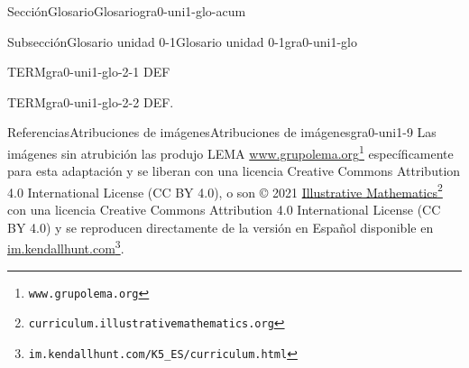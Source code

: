 \documentclass[twoside,10pt,]{article}
\begin{document}
\begin{sectionptx}{Sección}{Glosario}{}{Glosario}{}{}{gra0-uni1-glo-acum}
%
%
\typeout{************************************************}
\typeout{************************************************}
%
\begin{subsectionptx}{Subsección}{Glosario unidad 0-1}{}{Glosario unidad 0-1}{}{}{gra0-uni1-glo}
%
\begin{descriptionlist}
\begin{dlimedium}{TERM}{gra0-uni1-glo-2-1}%
DEF%
\end{dlimedium}%
\begin{dlimedium}{TERM}{gra0-uni1-glo-2-2}%
DEF.%
\end{dlimedium}%
\end{descriptionlist}
\end{subsectionptx}
\end{sectionptx}
%
%
\typeout{************************************************}
\typeout{************************************************}
%
\begin{references-section}{Referencias}{Atribuciones de imágenes}{}{Atribuciones de imágenes}{}{}{gra0-uni1-9}
Las imágenes sin atrubición las produjo LEMA \href{https://www.grupolema.org}{www.grupolema.org}\footnote{\nolinkurl{www.grupolema.org}\label{gra0-uni1-9-2-2}} específicamente para esta adaptación y se liberan con una licencia Creative Commons Attribution 4.0 International License (CC BY 4.0), o son © 2021 \href{https://curriculum.illustrativemathematics.org}{Illustrative Mathematics}\footnote{\nolinkurl{curriculum.illustrativemathematics.org}\label{gra0-uni1-9-2-4}} con una licencia Creative Commons Attribution 4.0 International License (CC BY 4.0) y se reproducen directamente de la versión en Español disponible en \href{https://im.kendallhunt.com/K5_ES/curriculum.html}{im.kendallhunt.com}\footnote{\nolinkurl{im.kendallhunt.com/K5_ES/curriculum.html}\label{gra0-uni1-9-2-6}}.%
\end{references-section}
%
%
\typeout{************************************************}
\typeout{************************************************}
%
\end{document}
